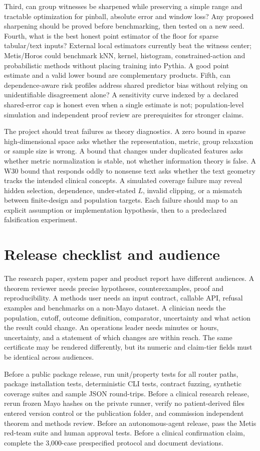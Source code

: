 \documentclass[11pt]{article}
\begin{document}
Third, can group witnesses be sharpened while preserving a simple range and tractable optimization for pinball, absolute error and window loss? Any proposed sharpening should be proved before benchmarking, then tested on a new seed. Fourth, what is the best honest point estimator of the floor for sparse tabular/text inputs? External local estimators currently beat the witness center; Metis/Horos could benchmark kNN, kernel, histogram, constrained-action and probabilistic methods without placing training into Pythia. A good point estimate and a valid lower bound are complementary products. Fifth, can dependence-aware risk profiles address shared predictor bias without relying on unidentifiable disagreement alone? A sensitivity curve indexed by a declared shared-error cap is honest even when a single estimate is not; population-level simulation and independent proof review are prerequisites for stronger claims.

The project should treat failures as theory diagnostics. A zero bound in sparse high-dimensional space asks whether the representation, metric, group relaxation or sample size is wrong. A bound that changes under duplicated features asks whether metric normalization is stable, not whether information theory is false. A W30 bound that responds oddly to nonsense text asks whether the text geometry tracks the intended clinical concepts. A simulated coverage failure may reveal hidden selection, dependence, under-stated $L$, invalid clipping, or a mismatch between finite-design and population targets. Each failure should map to an explicit assumption or implementation hypothesis, then to a predeclared falsification experiment.

\section{Release checklist and audience}
The research paper, system paper and product report have different audiences. A theorem reviewer needs precise hypotheses, counterexamples, proof and reproducibility. A methods user needs an input contract, callable API, refusal examples and benchmarks on a non-Mayo dataset. A clinician needs the population, cutoff, outcome definition, comparator, uncertainty and what action the result could change. An operations leader needs minutes or hours, uncertainty, and a statement of which changes are within reach. The same certificate may be rendered differently, but its numeric and claim-tier fields must be identical across audiences.

Before a public package release, run unit/property tests for all router paths, package installation tests, deterministic CLI tests, contract fuzzing, synthetic coverage suites and sample JSON round-trips. Before a clinical research release, rerun frozen Mayo hashes on the private runner, verify no patient-derived files entered version control or the publication folder, and commission independent theorem and methods review. Before an autonomous-agent release, pass the Metis red-team suite and human approval tests. Before a clinical confirmation claim, complete the 3,000-case prespecified protocol and document deviations.
\end{document}
